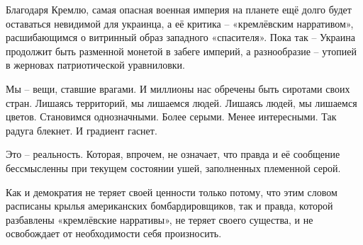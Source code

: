 Благодаря Кремлю, самая опасная военная империя на планете ещё долго будет
оставаться невидимой для украинца, а её критика – «кремлёвским нарративом»,
расшибающимся о витринный образ западного «спасителя». Пока так – Украина
продолжит быть разменной монетой в забеге империй, а разнообразие – утопией в
жерновах патриотической уравниловки.

Мы – вещи, ставшие врагами. И миллионы нас обречены быть сиротами своих стран.
Лишаясь территорий, мы лишаемся людей. Лишаясь людей, мы лишаемся цветов.
Становимся однозначными. Более серыми. Менее интересными. Так радуга блекнет. И
градиент гаснет. 

Это – реальность. Которая, впрочем, не означает, что правда и её сообщение
бессмысленны при текущем состоянии ушей, заполненных племенной серой. 

Как и демократия не теряет своей ценности только потому, что этим словом
расписаны крылья американских бомбардировщиков, так и правда, которой
разбавлены «кремлёвские нарративы», не теряет своего существа, и не освобождает
от необходимости себя произносить.
